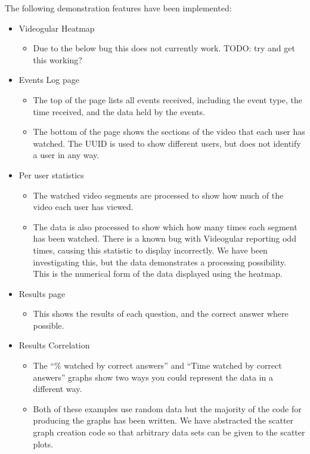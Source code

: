 \documentclass[12pt,a4paper]{article}
\begin{document}
The following demonstration features have been implemented:

\begin{itemize}
\item Videogular Heatmap
	\begin{itemize}
	\item Due to the below bug this does not currently work. TODO: try and get this working?
	\end{itemize}

\item Events Log page
	\begin{itemize}
	\item The top of the page lists all events received, including the event type, the time received, and the data held by the events.
	\item The bottom of the page shows the sections of the video that each user has watched. The UUID is used to show different users, but does not identify a user in any way.
	\end{itemize}

\item Per user statistics
	\begin{itemize}
	\item The watched video segments are processed to show how much of the video each user has viewed.
	\item The data is also processed to show which how many times each segment has been watched. There is a known bug with Videogular reporting odd times, causing this statistic to display incorrectly. We have been investigating this, but the data demonstrates a processing possibility. This is the numerical form of the data displayed using the heatmap.
	\end{itemize}

\item Results page
	\begin{itemize}
	\item This shows the results of each question, and the correct answer where possible.
	\end{itemize}

\item Results Correlation
	\begin{itemize}
	\item The ``\% watched by correct answers'' and ``Time watched by correct answers'' graphs show two ways you could represent the data in a different way.
	\item Both of these examples use random data but the majority of the code for producing the graphs has been written. We have abstracted the scatter graph creation code so that arbitrary data sets can be given to the scatter plots.
	\end{itemize}

\end{itemize}
\end{document}
